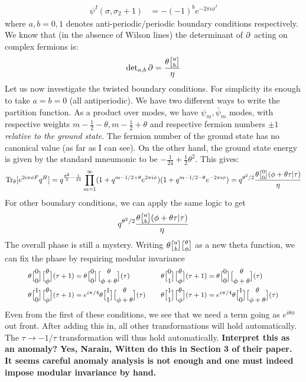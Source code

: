 \documentclass[11pt, class=article, crop=false]{standalone}
\begin{document}
\begin{enumerate}
\[\begin{aligned}
			\psi^I (\sigma, \sigma_2 + 1) &= -(-1)^{b} e^{-2\pi i \phi^I}
		\end{aligned}
		\]
		where $a,b = 0,1$ denotes anti-periodic/periodic boundary conditions respectively. We know that (in the absence of Wilson lines) the determinant of $\partial$ acting on complex fermions is:
		\[
			\text{det}_{a,b}\, \d = \frac{\theta \twist{a}{b}}{\eta}
		\]
		Let us now investigate the twisted boundary conditions. For simplicity its enough to take $a= b = 0$ (all antiperiodic). We have two different ways to write the partition function. As a product over modes, we have $\psi_m, \bar \psi_m$ modes, with respective weights $m-\frac12 -\theta, m-\frac12+\theta$ and respective fermion numbers $\pm1$ \emph{relative to the ground state}. The fermion number of the ground state has no canonical value (as far as I can see). On the other hand, the ground state energy is given by the standard mneumonic to be $-\frac{1}{24} + \frac12 \theta^2$. This gives:
		\[
			\Tr_{\theta} [e^{2 i \pi \phi F} q^{H}] = q^{\frac{\theta^2}{2} - \frac{1}{24}} \prod_{m=1}^\infty (1 + q^{m -1/2 + \theta} e^{2\pi i \phi}) (1 + q^{m -1/2 - \theta} e^{-2\pi i \phi}) = q^{\theta^2/2}\frac{\theta\twist00 (\phi + \theta \tau | \tau)}{\eta}
		\]
		For other boundary conditions, we can apply the same logic to get 
		\[
			q^{\theta^2/2} \frac{\theta \twist a b (\phi + \theta \tau | \tau)}{\eta}
		\]
		The overall phase is still a mystery. Writing $\theta \twist a b \twist \theta \phi$ as a new theta function, we can fix the phase by requiring modular invariance 
		\begin{equation}\label{eq:thetaproperties}
			\footnotesize
		\begin{aligned}
			\theta \twist 0 0 \twist \theta \phi (\tau+1) &= \theta \twist 0 0 \twist{\theta}{\phi+\theta} (\tau)
			&\quad&
			 \theta \twist 0 1 \twist \theta \phi (\tau+1) = \theta \twist 0 0 \twist{\theta}{\phi+\theta}(\tau)\\
			 \theta \twist10 \twist \theta \phi (\tau+1) &= e^{i \pi /4} \theta \twist11 \twist{\theta}{\phi+\theta}(\tau)
			 &\quad&
			 \theta \twist11 \twist \theta \phi (\tau+1) = e^{i\pi/4} \theta \twist10 \twist{\theta}{\phi+\theta}(\tau)
		\end{aligned}
		\end{equation}
		Even from the first of these conditions, we see that we need a term going as $e^{i \theta \phi}$ out front. After adding this in, all other transformations will hold automatically. The $\tau \to -1/\tau$ transformation will thus hold automatically. \textbf{Interpret this as an anomaly? Yes, Narain, Witten do this in Section 3 of their paper. It seems careful anomaly analysis is not enough and one must indeed impose modular invariance by hand.} 
		

\end{enumerate}
\end{document}
